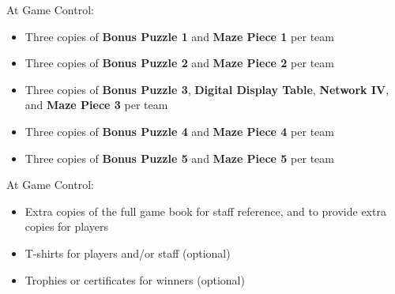 
At Game Control:

\begin{itemize}
  \item Three copies of \textbf{Bonus Puzzle 1} and \textbf{Maze Piece 1}
        per team
  \item Three copies of \textbf{Bonus Puzzle 2} and \textbf{Maze Piece 2}
        per team
  \item Three copies of \textbf{Bonus Puzzle 3}, \textbf{Digital Display Table},
        \textbf{Network IV}, and \textbf{Maze Piece 3}
        per team
  \item Three copies of \textbf{Bonus Puzzle 4} and \textbf{Maze Piece 4}
        per team
  \item Three copies of \textbf{Bonus Puzzle 5} and \textbf{Maze Piece 5}
        per team
\end{itemize}


At Game Control:

\begin{itemize}
  \item Extra copies of the full game book for staff reference,
        and to provide extra copies for players
  \item T-shirts for players and/or staff (optional)
  \item Trophies or certificates for winners (optional)
\end{itemize}

